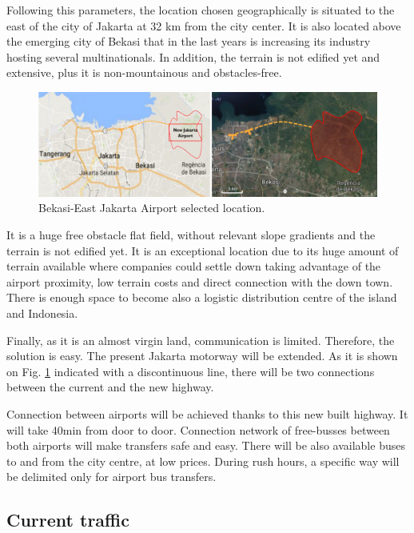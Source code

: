 Following this parameters, the location chosen geographically is situated to the east of the city of Jakarta at 32 km from the city center. It is also located above the emerging city of Bekasi that in the last years is increasing its industry hosting several multinationals. In addition, the terrain is not edified yet and extensive, plus it is non-mountainous and obstacles-free.

\begin{figure}[H]
	\centering
	\includegraphics[clip, trim=0cm 0cm 0cm 0cm, width=1\textwidth]{./images/PROGNOSIS/airport_location}
	\caption{Bekasi-East Jakarta Airport selected location.}
	\label{airprt-location}
\end{figure}

It is a huge free obstacle flat field, without relevant slope gradients and the terrain is not edified yet. It is an exceptional location due to its huge amount of terrain available where companies could settle down taking advantage of the airport proximity, low terrain costs and direct connection with the down town. There is enough space to become also a logistic distribution centre of the island and Indonesia.

Finally, as it is an almost virgin land, communication is limited. Therefore, the solution is easy. The present Jakarta motorway will be extended. As it is shown on Fig. \ref{airprt-location} indicated with a discontinuous line, there will be two connections between the current and the new highway. 

Connection between airports will be achieved thanks to this new built highway. It will take 40min from door to door. Connection network of free-busses between both airports will make transfers safe and easy. There will be also available buses to and from the city centre, at low prices. During rush hours, a specific way will be delimited only for airport bus transfers. 

	\clearpage
	\subsection{Current traffic}
